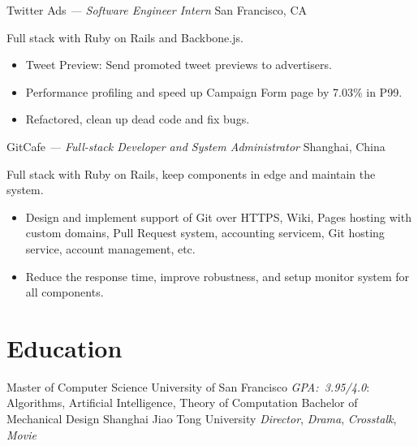 \documentclass[]{friggeri-cv} %
\begin{document}
  \begin{entrylist}
  {Twitter Ads \emph{--- Software Engineer Intern}}
  {San Francisco, CA}
  {
    Full stack with Ruby on Rails and Backbone.js.\@
    \begin{itemize}
      \item Tweet Preview: Send promoted tweet previews to advertisers.
      \item Performance profiling and speed up Campaign Form page by 7.03\% in P99.
      \item Refactored, clean up dead code and fix bugs.
    \end{itemize}
  }
  {GitCafe \emph{--- Full-stack Developer and System Administrator}}
  {Shanghai, China}
  {
    Full stack with Ruby on Rails, keep components in edge and maintain the system.\@
    \begin{itemize}
    \item Design and implement support of Git over HTTPS, Wiki, Pages hosting with custom domains,
    Pull Request system, accounting servicem, Git hosting service, account management, etc.
    \item Reduce the response time, improve robustness, and setup monitor system for all components.
    \end{itemize}
  }
\end{entrylist}


\section{Education}

\begin{entrylist}
  {Master \textnormal{of Computer Science}}
  {University of San Francisco}
  {
    \emph{GPA:~3.95/4.0}: Algorithms, Artificial Intelligence, Theory of Computation
  }
  {Bachelor \textnormal{of Mechanical Design}}
  {Shanghai Jiao Tong University}
  {
    \emph{Director}, \emph{Drama}, \emph{Crosstalk}, \emph{Movie}
  }
\end{entrylist}
\end{document}

